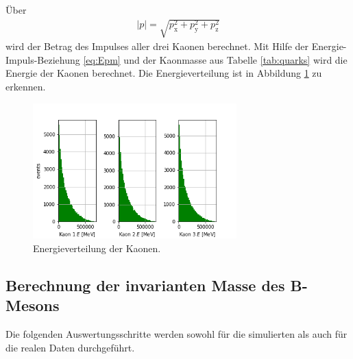 Über 
\begin{align}
  |p|=\sqrt{p_\mathrm{x}^2 + p_\mathrm{y}^2 + p_\mathrm{z}^2 }
  \label{eq:Betrag}
\end{align}
wird der Betrag des Impulses aller drei Kaonen berechnet. Mit Hilfe der Energie-Impuls-Beziehung \eqref{eq:Epm} und der Kaonmasse aus Tabelle \ref{tab:quarks} wird die Energie der Kaonen berechnet. Die Energieverteilung ist in Abbildung \ref{fig:Energie1} zu erkennen.
\begin{figure}
  \centering
  \includegraphics[width=0.7\textwidth]{plots/sim_Eall_hist.png}
  \caption{Energieverteilung der Kaonen.}
  \label{fig:Energie1}
\end{figure} 
\FloatBarrier

\subsection{Berechnung der invarianten Masse des B-Mesons}
Die folgenden Auswertungsschritte werden sowohl für die simulierten als auch für die realen Daten durchgeführt.

